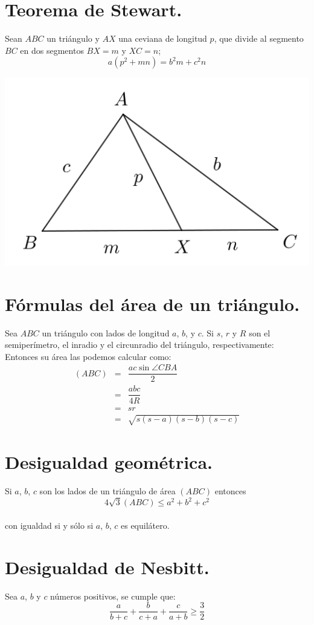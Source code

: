 \documentclass[12pt,a4paper,oneside]{book}
\begin{document}
\section{Teorema de Stewart.}
Sean $ABC$ un triángulo y $AX$ una ceviana de longitud $p$, que divide al segmento $BC$ en dos segmentos $BX=m$ y $XC=n$; $$a(p^2 +mn) = b^2m + c^2n$$
\begin{center}
\includegraphics[scale=0.6]{Imagenes/stewart.png} 
\end{center}
\section{Fórmulas del área de un triángulo.}
Sea $ABC$ un triángulo con lados de longitud $a$, $b$, y $c$. Si $s$, $r$ y $R$ son el semiperímetro, el inradio y el circunradio del triángulo, respectivamente: Entonces su área las podemos calcular como:
\begin{eqnarray*}
(ABC)&=& \dfrac{ac \sin \angle CBA}{2}
\\&=& \dfrac{abc}{4R}
\\&=& sr
\\&=& \sqrt{s(s-a)(s-b)(s-c)}
\end{eqnarray*}
\section{Desigualdad geométrica.}
Si $a$, $b$, $c$ son los lados de un triángulo de área $(ABC)$ entonces $$4\sqrt{3}(ABC) \leq a^2 + b^2 + c^2$$
\\con igualdad si y sólo si $a$, $b$, $c$ es equilátero.
\section{Desigualdad de Nesbitt.}
Sea $a$, $b$ y $c$ números positivos, se cumple que:
$$\dfrac{a}{b+c} + \dfrac{b}{c+a}+ \dfrac{c}{a+b} \geq \dfrac{3}{2}$$
\end{document}
